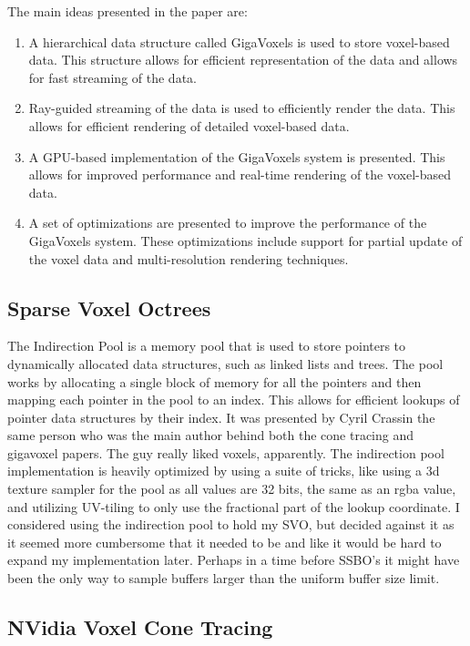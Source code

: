 The main ideas presented in the paper are: 
\begin{enumerate}
	\item A hierarchical data structure called GigaVoxels is used to store voxel-based data. This structure allows for efficient representation of the data and allows for fast streaming of the data.
	\item Ray-guided streaming of the data is used to efficiently render the data. This allows for efficient rendering of detailed voxel-based data.
	\item A GPU-based implementation of the GigaVoxels system is presented. This allows for improved performance and real-time rendering of the voxel-based data.
	\item A set of optimizations are presented to improve the performance of the GigaVoxels system. These optimizations include support for partial update of the voxel data and multi-resolution rendering techniques.
\end{enumerate}

\subsection{Sparse Voxel Octrees}
The Indirection Pool \cite{10.5555/1062395} is a memory pool that is used to store pointers to dynamically allocated data structures, such as linked lists and trees. The pool works by allocating a single block of memory for all the pointers and then mapping each pointer in the pool to an index. This allows for efficient lookups of pointer data structures by their index. It was presented by Cyril Crassin the same person who was the main author behind both the cone tracing and gigavoxel papers. The guy really liked voxels, apparently. The indirection pool implementation is heavily optimized by using a suite of tricks, like using a 3d texture sampler for the pool as all values are 32 bits, the same as an rgba value, and utilizing UV-tiling to only use the fractional part of the lookup coordinate. I considered using the indirection pool to hold my SVO, but decided against it as it seemed more cumbersome that it needed to be and like it would be hard to expand my implementation later. Perhaps in a time before SSBO's it might have been the only way to sample buffers larger than the uniform buffer size limit.
\subsection{NVidia Voxel Cone Tracing}

